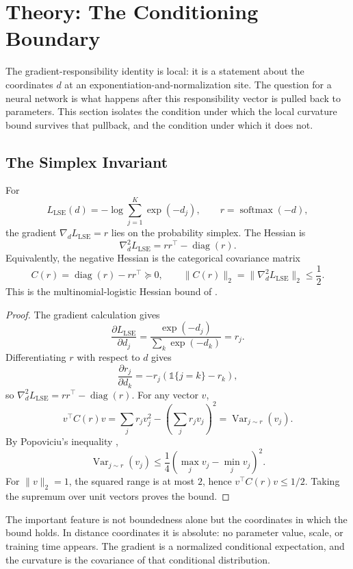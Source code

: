 \section{Theory: The Conditioning Boundary}
\label{sec:theory}
The gradient-responsibility identity is local: it is a statement about the
coordinates $d$ at an exponentiation-and-normalization site. The question for
a neural network is what happens after this responsibility vector is pulled
back to parameters. This section isolates the condition under which the local
curvature bound survives that pullback, and the condition under which it does
not.

\subsection{The Simplex Invariant}
\begin{lemma}
\label{lem:simplex}
For
\[
    L_{\mathrm{LSE}}(d) = -\log \sum_{j=1}^K \exp(-d_j),
    \qquad
    r = \operatorname{softmax}(-d),
\]
the gradient $\nabla_d L_{\mathrm{LSE}}=r$ lies on the probability simplex.
The Hessian is
\[
    \nabla_d^2 L_{\mathrm{LSE}}
    = rr^\top - \operatorname{diag}(r).
\]
Equivalently, the negative Hessian is the categorical covariance matrix
\[
    C(r)
    = \operatorname{diag}(r)-rr^\top
    \succeq 0,
    \qquad
    \|C(r)\|_2 = \|\nabla_d^2 L_{\mathrm{LSE}}\|_2 \le \frac{1}{2}.
\]
This is the multinomial-logistic Hessian bound of
\citet{bohning1992multinomial}.
\end{lemma}
\begin{proof}
The gradient calculation gives
\[
    \frac{\partial L_{\mathrm{LSE}}}{\partial d_j}
    =
    \frac{\exp(-d_j)}{\sum_k \exp(-d_k)}
    = r_j.
\]
Differentiating $r$ with respect to $d$ gives
\[
    \frac{\partial r_j}{\partial d_k}
    = -r_j(\mathbb{1}\{j=k\}-r_k),
\]
so $\nabla_d^2 L_{\mathrm{LSE}}=rr^\top-\operatorname{diag}(r)$. For any
vector $v$,
\[
    v^\top C(r)v
    =
    \sum_j r_j v_j^2 - \left(\sum_j r_j v_j\right)^2
    =
    \operatorname{Var}_{j\sim r}(v_j).
\]
By Popoviciu's inequality \citep{popoviciu1935equations},
\[
    \operatorname{Var}_{j\sim r}(v_j)
    \le \frac{1}{4}(\max_j v_j-\min_j v_j)^2.
\]
For $\|v\|_2=1$, the squared range is at most $2$, hence
$v^\top C(r)v\le 1/2$. Taking the supremum over unit vectors proves the bound.
\end{proof}
The important feature is not boundedness alone but the coordinates in which
the bound holds. In distance coordinates it is absolute: no parameter value,
scale, or training time appears. The gradient is a normalized conditional
expectation, and the curvature is the covariance of that conditional
distribution.

